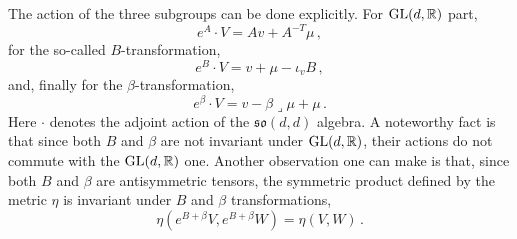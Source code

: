 \documentclass[debug]{phd}
\begin{document}
					The action of the three subgroups can be done explicitly.
					For $\mathrm{GL}(d,\mathbb{R})$ part,
							\begin{equation}
								e^A \cdot V = A v + A^{-T} \mu \, , 
							\end{equation}
					for the so-called $B$-transformation,
							\begin{equation}\label{bact}
								e^B \cdot V = v + \mu - \iota_v B \, , 
							\end{equation}
					and, finally for the $\beta$-transformation,
							\begin{equation}
								e^\beta \cdot V = v - \beta \lrcorner \mu + \mu \, .
							\end{equation}
					Here $\cdot$ denotes the adjoint action of the $\mathfrak{so}(d,d)$ algebra.
					A noteworthy fact is that since both $B$ and $\beta$ are not invariant under $\mathrm{GL}(d, \mathbb{R})$, their actions do not commute with the $\mathrm{GL}(d, \mathbb{R})$ one.
					Another observation one can make is that, since both $B$ and $\beta$ are antisymmetric tensors, the symmetric product defined by the metric $\eta$ is invariant under $B$ and $\beta$ transformations,
							\begin{equation}
								\eta(e^{B + \beta} V, e^{B + \beta} W ) = \eta (V, W)\, .
							\end{equation}
\end{document}
